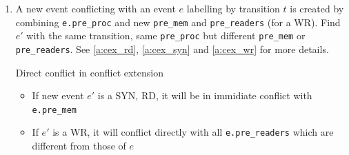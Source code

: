 \documentclass{llncs}
\begin{document}
\begin{enumerate}
\begin{algorithm}{}
\begin{enumerate}
					for each \verb!pre_readers[i]! $(i \in [0..numprocs])$,
					
					set \verb!parent = pre_readers[i]!
					
			\end{enumerate}
			Let's consider $parent$.
			
			\begin{itemize}
				\item
					\verb!parent->trans->type! is RD or SYN: 
					If found(e) in \verb!parent.post_rws!, then $this$ and $e$ are in direct
					conflict
				\item
					\verb!parent->trans->type! is WR: If found(this) and found(e) in the same 
					\verb!parent.post_mem[i]!, then they definitely
					conflict immediately.
			\end{itemize}
			\noindent
			\caption{Check direct conflict between two enabled events}
			\label{a:dicfl}
		\end{algorithm}

	\item
		A new event conflicting with an event $e$ labelling by transition $t$ is created by
		combining \verb!e.pre_proc! and new \verb!pre_mem! and \verb!pre_readers! (for a WR).
		Find $e'$ with the same transition, same \verb!pre_proc! but different \verb!pre_mem! or
		\verb!pre_readers!. See \cref{a:cex_rd}, \cref{a:cex_syn} and \cref{a:cex_wr} for more
		 details.
		 
		\begin{lemma}{Direct conflict in conflict extension}
			\begin{itemize}
				\item
					If new event $e'$ is a SYN, RD, it will be in immidiate conflict with \verb!e.pre_mem!
				\item
					If $e'$ is a WR, it will conflict directly with all \verb!e.pre_readers! which are
					different from those of $e$
			\end{itemize}
		\end{lemma}
		
\end{enumerate}
\end{document}
